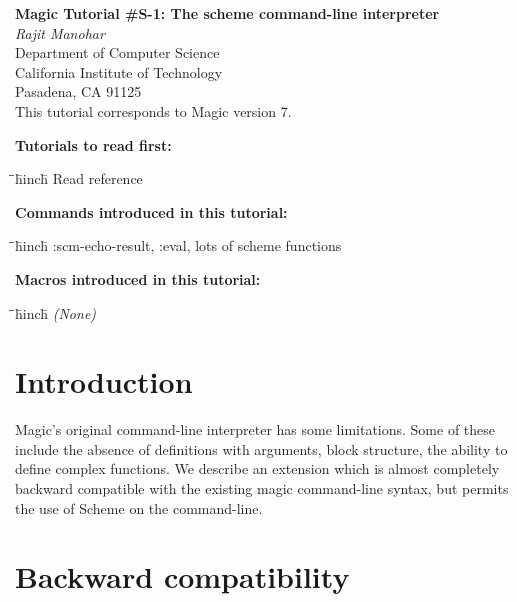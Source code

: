 \documentclass[letterpaper,twoside,12pt]{article}
\def\hinch{\hspace*{0.5in}}
\def\starti{\begin{center}\begin{tabbing}\hinch\=\hinch\=\hinch\=hinch\hinch\=\kill}
\def\endi{\end{tabbing}\end{center}}
\def\mytitle{Magic Tutorial \#S-1: The scheme command-line interpreter}
\begin{document}
\makeatletter
\newcommand{\ps@magic}{%
	\renewcommand{\@oddhead}{\mytitle\hfil\today}%
	\renewcommand{\@evenhead}{\today\hfil\mytitle}%
	\renewcommand{\@evenfoot}{\hfil\textrm{--{\thepage}--}\hfil}%
	\renewcommand{\@oddfoot}{\@evenfoot}}
\newcommand{\ps@mplain}{%
	\renewcommand{\@oddhead}{}%
	\renewcommand{\@evenhead}{}%
	\renewcommand{\@evenfoot}{\hfil\textrm{--{\thepage}--}\hfil}%
	\renewcommand{\@oddfoot}{\@evenfoot}}
\makeatother
\pagestyle{magic}
\thispagestyle{mplain}


\begin{center}
  {\bfseries \Large \mytitle} \\
  \vspace*{0.5in}
  {\itshape Rajit Manohar} \\
  \vspace*{0.5in}
   Department of Computer Science \\
   California Institute of Technology \\
   Pasadena, CA  91125 \\
  \vspace*{0.25in}
  This tutorial corresponds to Magic version 7. \\
\end{center}
\vspace*{0.5in}

{\noindent\bfseries\large Tutorials to read first:}
\starti
   \> Read reference \cite{sussman}
\endi

{\noindent\bfseries\large Commands introduced in this tutorial:}
\starti
   \> :scm-echo-result, :eval, lots of scheme functions
\endi

{\noindent\bfseries\large Macros introduced in this tutorial:}

\starti
   \> {\itshape (None)}
\endi

\vspace*{0.75in}
\section{Introduction}

Magic's original command-line interpreter has some limitations. Some of 
these include the absence of definitions with arguments, block structure,
the ability to define complex functions. We describe an extension which
is almost completely backward compatible with the existing magic
command-line syntax, but permits the use of Scheme on the command-line.

\section{Backward compatibility}
\end{document}
